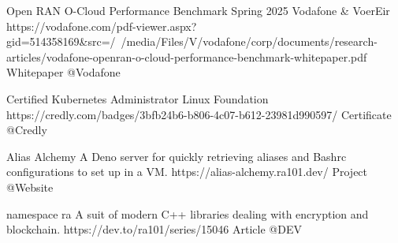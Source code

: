 


\begin{cvhonors}


\cvhonor
    {Open RAN O-Cloud Performance Benchmark Spring 2025} %
    {Vodafone \& VoerEir} %
    {https://vodafone.com/pdf-viewer.aspx?gid=514358169&src=/~/media/Files/V/vodafone/corp/documents/research-articles/vodafone-openran-o-cloud-performance-benchmark-whitepaper.pdf}
    {Whitepaper } %
    {@Vodafone}

\cvhonor
    {Certified Kubernetes Administrator} %
    {Linux Foundation} %
    {https://credly.com/badges/3bfb24b6-b806-4c07-b612-23981d990597/}
    {Certificate } %
    {@Credly}

\cvhonor
    {Alias Alchemy} %
    {A Deno server for quickly retrieving aliases and Bashrc configurations to set up in a VM.} %
    {https://alias-alchemy.ra101.dev/}
    {Project} %
    {@Website}

\cvhonor
    {namespace ra} %
    {A suit of modern C++ libraries dealing with encryption and blockchain.} %
    {https://dev.to/ra101/series/15046}
    {Article} %
    {@DEV}

\end{cvhonors}
